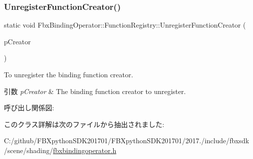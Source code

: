\subsubsection{\texorpdfstring{Unregister\+Function\+Creator()}{UnregisterFunctionCreator()}}
{\footnotesize\ttfamily static void Fbx\+Binding\+Operator\+::\+Function\+Registry\+::\+Unregister\+Function\+Creator (\begin{DoxyParamCaption}\item[{\hyperlink{class_fbx_binding_operator_1_1_function_creator_base}{Function\+Creator\+Base} const \&}]{p\+Creator }\end{DoxyParamCaption})\hspace{0.3cm}{\ttfamily [static]}}

To unregister the binding function creator. 
\begin{DoxyParams}{引数}
{\em p\+Creator} & The binding function creator to unregister. \\
\hline
\end{DoxyParams}
呼び出し関係図\+:


このクラス詳解は次のファイルから抽出されました\+:\begin{DoxyCompactItemize}
\item 
C\+:/github/\+F\+B\+Xpython\+S\+D\+K201701/\+F\+B\+Xpython\+S\+D\+K201701/2017./include/fbxsdk/scene/shading/\hyperlink{fbxbindingoperator_8h}{fbxbindingoperator.\+h}\end{DoxyCompactItemize}
